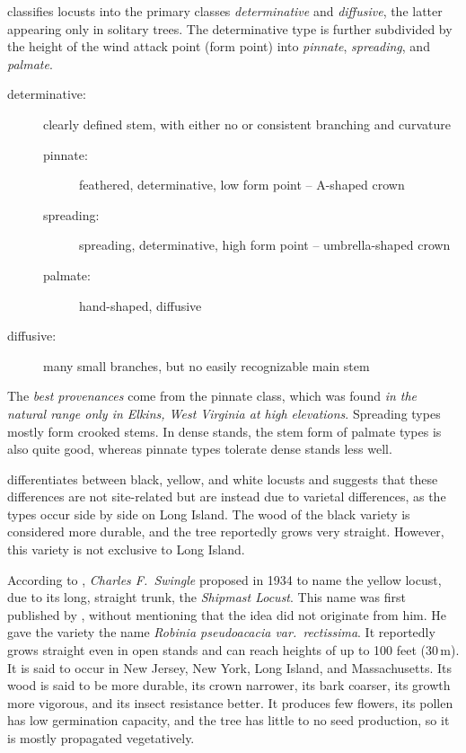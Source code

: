 \citet{hopp1941robinie} classifies locusts into the primary classes \emph{determinative} and \emph{diffusive}, the latter appearing only in solitary trees. The determinative type is further subdivided by the height of the wind attack point (form point) into \emph{pinnate}, \emph{spreading}, and \emph{palmate}.
\begin{description}
\item[determinative:] clearly defined stem, with either no or consistent branching and curvature
  \begin{description}
    \item[pinnate:] feathered, determinative, low form point -- A-shaped crown
    \item[spreading:] spreading, determinative, high form point -- umbrella-shaped crown
    \item[palmate:] hand-shaped, diffusive
  \end{description}
\item[diffusive:] many small branches, but no easily recognizable main stem
\end{description}
The \emph{best provenances} come from the pinnate class, which was found \emph{in the natural range only in Elkins, West Virginia at high elevations}. Spreading types mostly form crooked stems. In dense stands, the stem form of palmate types is also quite good, whereas pinnate types tolerate dense stands less well.

\citet{cope1929robinie} differentiates between black, yellow, and white locusts and suggests that these differences are not site-related but are instead due to varietal differences, as the types occur side by side on Long Island. The wood of the black variety is considered more durable, and the tree reportedly grows very straight. However, this variety is not exclusive to Long Island.

According to \citet{detwiler1937robinie}, \emph{Charles F.\ Swingle} proposed in 1934 to name the yellow locust, due to its long, straight trunk, the \emph{Shipmast Locust}. This name was first published by \citet{raber1936shipmast}, without mentioning that the idea did not originate from him. He gave the variety the name \emph{Robinia pseudoacacia var.\ rectissima}. It reportedly grows straight even in open stands and can reach heights of up to 100 feet (30\,m). It is said to occur in New Jersey, New York, Long Island, and Massachusetts. Its wood is said to be more durable, its crown narrower, its bark coarser, its growth more vigorous, and its insect resistance better. It produces few flowers, its pollen has low germination capacity, and the tree has little to no seed production, so it is mostly propagated vegetatively.


